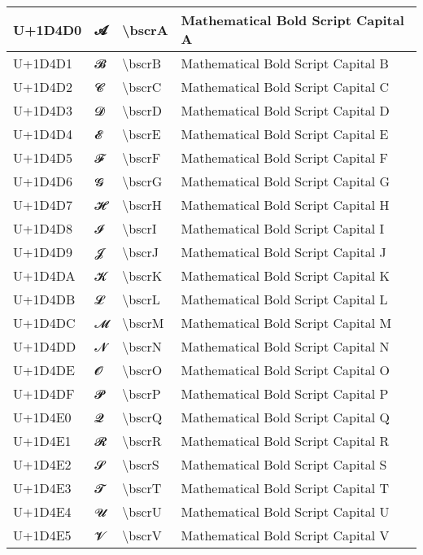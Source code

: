 \begin{table}[h]
\begin{tabulary}{\linewidth}{|L|L|L|L|}
\hline
U+1D4D0 & 𝓐 & {\textbackslash}bscrA & Mathematical Bold Script Capital A \\
\hline
U+1D4D1 & 𝓑 & {\textbackslash}bscrB & Mathematical Bold Script Capital B \\
\hline
U+1D4D2 & 𝓒 & {\textbackslash}bscrC & Mathematical Bold Script Capital C \\
\hline
U+1D4D3 & 𝓓 & {\textbackslash}bscrD & Mathematical Bold Script Capital D \\
\hline
U+1D4D4 & 𝓔 & {\textbackslash}bscrE & Mathematical Bold Script Capital E \\
\hline
U+1D4D5 & 𝓕 & {\textbackslash}bscrF & Mathematical Bold Script Capital F \\
\hline
U+1D4D6 & 𝓖 & {\textbackslash}bscrG & Mathematical Bold Script Capital G \\
\hline
U+1D4D7 & 𝓗 & {\textbackslash}bscrH & Mathematical Bold Script Capital H \\
\hline
U+1D4D8 & 𝓘 & {\textbackslash}bscrI & Mathematical Bold Script Capital I \\
\hline
U+1D4D9 & 𝓙 & {\textbackslash}bscrJ & Mathematical Bold Script Capital J \\
\hline
U+1D4DA & 𝓚 & {\textbackslash}bscrK & Mathematical Bold Script Capital K \\
\hline
U+1D4DB & 𝓛 & {\textbackslash}bscrL & Mathematical Bold Script Capital L \\
\hline
U+1D4DC & 𝓜 & {\textbackslash}bscrM & Mathematical Bold Script Capital M \\
\hline
U+1D4DD & 𝓝 & {\textbackslash}bscrN & Mathematical Bold Script Capital N \\
\hline
U+1D4DE & 𝓞 & {\textbackslash}bscrO & Mathematical Bold Script Capital O \\
\hline
U+1D4DF & 𝓟 & {\textbackslash}bscrP & Mathematical Bold Script Capital P \\
\hline
U+1D4E0 & 𝓠 & {\textbackslash}bscrQ & Mathematical Bold Script Capital Q \\
\hline
U+1D4E1 & 𝓡 & {\textbackslash}bscrR & Mathematical Bold Script Capital R \\
\hline
U+1D4E2 & 𝓢 & {\textbackslash}bscrS & Mathematical Bold Script Capital S \\
\hline
U+1D4E3 & 𝓣 & {\textbackslash}bscrT & Mathematical Bold Script Capital T \\
\hline
U+1D4E4 & 𝓤 & {\textbackslash}bscrU & Mathematical Bold Script Capital U \\
\hline
U+1D4E5 & 𝓥 & {\textbackslash}bscrV & Mathematical Bold Script Capital V \\

\end{tabulary}
\end{table}
